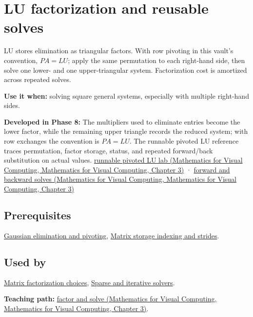\hypertarget{appendix-55e4b5b0a1e6}{}\label{referencestart:appendix-55e4b5b0a1e6}
\section{LU factorization and reusable solves}\label{appendix-55e4b5b0a1e6-lu-factorization-and-reusable-solves}

LU stores elimination as triangular factors. With row pivoting in this vault's convention, \(PA=LU\); apply the same permutation to each right-hand side, then solve one lower- and one upper-triangular system. Factorization cost is amortized across repeated solves.

\textbf{Use it when:} solving square general systems, especially with multiple right-hand sides.

\textbf{Developed in Phase 8:} The multipliers used to eliminate entries become the lower factor, while the remaining upper triangle records the reduced system; with row exchanges the convention is \(PA=LU\). The runnable pivoted LU reference traces permutation, factor storage, status, and repeated forward/back substitution on actual values. \href{../02-Mathematics-for-Visual-Computing/main.pdf\#nameddest=01-foundations-i-ch019-a-runnable-pivoted-lu-reference-preserves-the-elimination-history}{runnable pivoted LU lab (Mathematics for Visual Computing, Mathematics for Visual Computing, Chapter 3)} · \href{../02-Mathematics-for-Visual-Computing/main.pdf\#nameddest=01-foundations-i-ch019-triangular-solves-perform-the-cheap-second-half}{forward and backward solves (Mathematics for Visual Computing, Mathematics for Visual Computing, Chapter 3)}

\subsection{Prerequisites}\label{appendix-55e4b5b0a1e6-prerequisites}

\hyperref[appendix-f6e77f4a200f]{Gaussian elimination and pivoting}, \hyperref[appendix-ffdc1d4e5350]{Matrix storage indexing and strides}.

\subsection{Used by}\label{appendix-55e4b5b0a1e6-used-by}

\hyperref[appendix-221a483bec2d]{Matrix factorization choices}, \hyperref[appendix-67c87a3d9e94]{Sparse and iterative solvers}.

\textbf{Teaching path:} \href{../02-Mathematics-for-Visual-Computing/main.pdf\#nameddest=01-foundations-i-ch019-elimination-turns-the-geometry-into-an-auditable-calculation}{factor and solve (Mathematics for Visual Computing, Mathematics for Visual Computing, Chapter 3)}.
